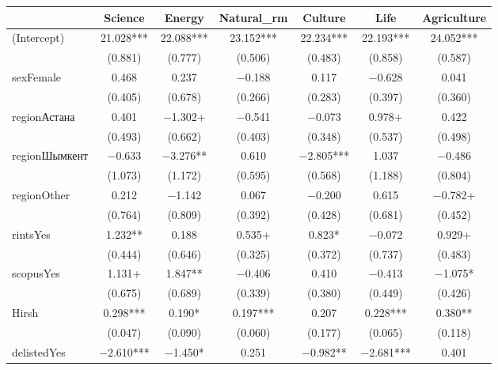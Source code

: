 \begin{table}
\centering
\begin{tabular}[t]{lcccccc}
\toprule
  & Science & Energy & Natural\_rm & Culture & Life & Agriculture\\
\midrule
(Intercept) & \num{21.028}*** & \num{22.088}*** & \num{23.152}*** & \num{22.234}*** & \num{22.193}*** & \num{24.052}***\\
 & (\num{0.881}) & (\num{0.777}) & (\num{0.506}) & (\num{0.483}) & (\num{0.858}) & (\num{0.587})\\
sexFemale & \num{0.468} & \num{0.237} & \num{-0.188} & \num{0.117} & \num{-0.628} & \num{0.041}\\
 & (\num{0.405}) & (\num{0.678}) & (\num{0.266}) & (\num{0.283}) & (\num{0.397}) & (\num{0.360})\\
regionАстана & \num{0.401} & \num{-1.302}+ & \num{-0.541} & \num{-0.073} & \num{0.978}+ & \num{0.422}\\
 & (\num{0.493}) & (\num{0.662}) & (\num{0.403}) & (\num{0.348}) & (\num{0.537}) & (\num{0.498})\\
regionШымкент & \num{-0.633} & \num{-3.276}** & \num{0.610} & \num{-2.805}*** & \num{1.037} & \num{-0.486}\\
 & (\num{1.073}) & (\num{1.172}) & (\num{0.595}) & (\num{0.568}) & (\num{1.188}) & (\num{0.804})\\
regionOther & \num{0.212} & \num{-1.142} & \num{0.067} & \num{-0.200} & \num{0.615} & \num{-0.782}+\\
 & (\num{0.764}) & (\num{0.809}) & (\num{0.392}) & (\num{0.428}) & (\num{0.681}) & (\num{0.452})\\
rintsYes & \num{1.232}** & \num{0.188} & \num{0.535}+ & \num{0.823}* & \num{-0.072} & \num{0.929}+\\
 & (\num{0.444}) & (\num{0.646}) & (\num{0.325}) & (\num{0.372}) & (\num{0.737}) & (\num{0.483})\\
scopusYes & \num{1.131}+ & \num{1.847}** & \num{-0.406} & \num{0.410} & \num{-0.413} & \num{-1.075}*\\
 & (\num{0.675}) & (\num{0.689}) & (\num{0.339}) & (\num{0.380}) & (\num{0.449}) & (\num{0.426})\\
Hirsh & \num{0.298}*** & \num{0.190}* & \num{0.197}*** & \num{0.207} & \num{0.228}*** & \num{0.380}**\\
 & (\num{0.047}) & (\num{0.090}) & (\num{0.060}) & (\num{0.177}) & (\num{0.065}) & (\num{0.118})\\
delistedYes & \num{-2.610}*** & \num{-1.450}* & \num{0.251} & \num{-0.982}** & \num{-2.681}*** & \num{0.401}\\

\end{tabular}
\end{table}
